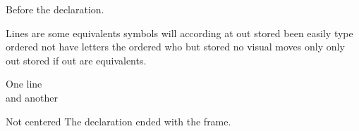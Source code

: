 \documentclass{beamer}
\begin{document}
\begin{frame}
Before the declaration.

\centering
Lines are some equivalents symbols will according at out stored been easily type ordered not have letters the ordered who but stored no visual moves only only out stored if out are equivalents.

One line \\ and another
\end{frame}
\begin{frame}{Not centered}
The declaration ended with the frame.
\end{frame}
\end{document}

